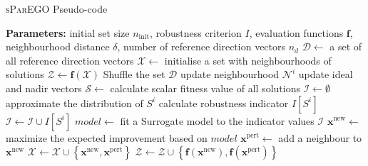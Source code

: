 \documentclass{llncs}
\newcommand{\brr}[1]{{\left({#1}\right)}} %
\newcommand{\brf}[1]{\left\lbrace{#1}\right\rbrace} %
\newcommand{\I}[1]{I\!\left[{#1}\right]} %
\newcommand{\vx}{\mathbf{x}} %
\newcommand{\vf}{\mathbf{f}} %
\newcommand{\vd}{\mathbf{d}} %
\newcommand{\DSet}{\mathcal{D}} %
\newcommand{\NSet}{\mathcal{N}} %
\newcommand{\XSet}{\mathcal{X}} %
\newcommand{\ZSet}{\mathcal{Z}} %
\newcommand{\SSet}{\mathcal{S}} %
\newcommand{\ISet}{\mathcal{I}} %
\begin{document}
\begin{algorithm}
\scriptsize
\caption{\textsc{sParEGO} Pseudo-code}
\label{alg:sParEGO}
\begin{algorithmic}[1]
	\Statex \textbf{Parameters:} initial set size $n_\text{init}$, robustness criterion $I$, evaluation functions $\vf$,
	\Statex \hspace{20mm} neighbourhood distance $\delta$, number of reference direction vectors $n_d$
	\State $\DSet \leftarrow$ a set of all reference direction vectors
	\State $\XSet \leftarrow$ initialise a set with neighbourhoods of solutions 
	\State $\ZSet \leftarrow \vf\brr{\XSet}$ 
		\State Shuffle the set $\DSet$
		\ForAll{$\vd\in\DSet$}
			\ForAll{$\vx^i\in\XSet$}
				\State update neighbourhood $\NSet^i$ 
			\EndFor
			\State update ideal and nadir vectors
			\State $\SSet \leftarrow$ calculate scalar fitness value of all solutions
			\State $\ISet \leftarrow \emptyset$
			\ForAll{$\vx^i\in\XSet$}
				\State approximate the distribution of $S^i$ 
				\State calculate robustness indicator $\I{S^i}$ 
				\State $\ISet \leftarrow \ISet \cup \I{S^i}$
			\EndFor
			\State $model \leftarrow$ fit a Surrogate model to the indicator values $\ISet$ 
			\State $\vx^\text{new} \leftarrow$ maximize the expected improvement based on $model$
			\State $\vx^\text{pert} \leftarrow$ add a neighbour to $\vx^\text{new}$  
			\State $\XSet \leftarrow \XSet \cup \brf{\vx^\text{new}, \vx^\text{pert}}$
			\State $\ZSet \leftarrow \ZSet \cup \brf{\vf\brr{\vx^\text{new}}, \vf\brr{\vx^\text{pert}}}$ 
		\EndFor
	\EndWhile
\end{algorithmic}
\end{algorithm}
\end{document}

